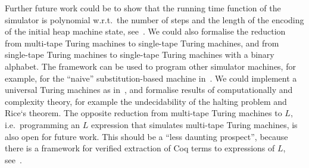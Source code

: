 
Further future work could be to show that the running time function of the simulator is polynomial w.r.t.\ the number of steps and the length of the
encoding of the initial heap machine state, see~\cite{ForsterLOLA2017}.  We could also formalise the reduction from multi-tape Turing machines to
single-tape Turing machines, and from single-tape Turing machines to single-tape Turing machines with a binary alphabet.  The framework can be used to
program other simulator machines, for example, for the ``naive'' substitution-based machine in~\cite{KunzeEtAl:2018:Formal}.  We could implement a
universal Turing machines as in~\cite{asperti2015}, and formalise results of computationally and complexity theory, for example the undecidability of
the halting problem and Rice`s theorem.  The opposite reduction from multi-tape Turing machines to $L$, i.e.\ programming an $L$ expression that
simulates multi-tape Turing machines, is also open for future work.  This should be a ``less daunting prospect'', because there is a framework for
verified extraction of Coq terms to expressions of $L$, see~\cite{forster2016verified}.


